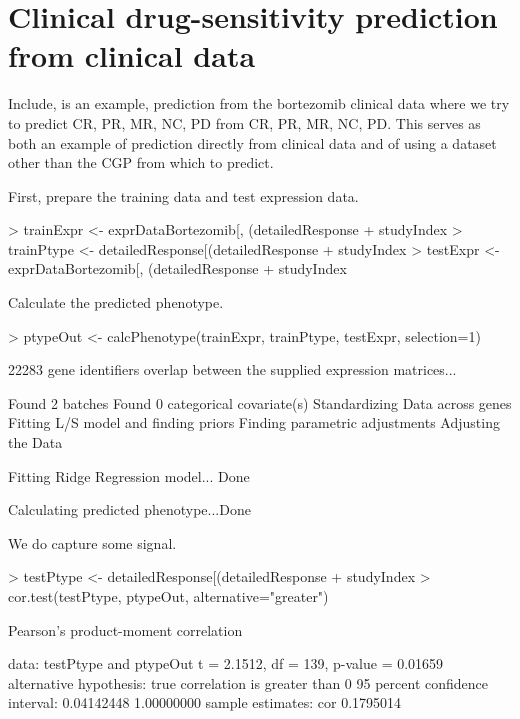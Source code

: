\documentclass[a4paper]{article}
\begin{document}
\section{Clinical drug-sensitivity prediction from clinical data}

Include, is an example, prediction from the bortezomib clinical data where we try to predict CR, PR, MR, NC, PD from CR, PR, MR, NC, PD. This serves as both an example of prediction directly from clinical data and of using a dataset other than the CGP from which to predict.

First, prepare the training data and test expression data.
\begin{Schunk}
\begin{Sinput}
> trainExpr <- exprDataBortezomib[, (detailedResponse %
+ studyIndex %
> trainPtype <- detailedResponse[(detailedResponse %
+ studyIndex %
> testExpr <- exprDataBortezomib[, (detailedResponse %
+ studyIndex %
\end{Sinput}
\end{Schunk}

Calculate the predicted phenotype.
\begin{Schunk}
\begin{Sinput}
> ptypeOut <- calcPhenotype(trainExpr, trainPtype, testExpr, selection=1)
\end{Sinput}
\begin{Soutput}
 22283  gene identifiers overlap between the supplied expression matrices... 
 
Found 2 batches
Found 0  categorical covariate(s)
Standardizing Data across genes
Fitting L/S model and finding priors
Finding parametric adjustments
Adjusting the Data

Fitting Ridge Regression model... Done

Calculating predicted phenotype...Done
\end{Soutput}
\end{Schunk}

We do capture some signal.
\begin{Schunk}
\begin{Sinput}
> testPtype <- detailedResponse[(detailedResponse %
+ studyIndex %
> cor.test(testPtype, ptypeOut, alternative="greater")
\end{Sinput}
\begin{Soutput}
	Pearson's product-moment correlation

data:  testPtype and ptypeOut
t = 2.1512, df = 139, p-value = 0.01659
alternative hypothesis: true correlation is greater than 0
95 percent confidence interval:
 0.04142448 1.00000000
sample estimates:
      cor 
0.1795014 
\end{Soutput}
\end{Schunk}
\end{document}

